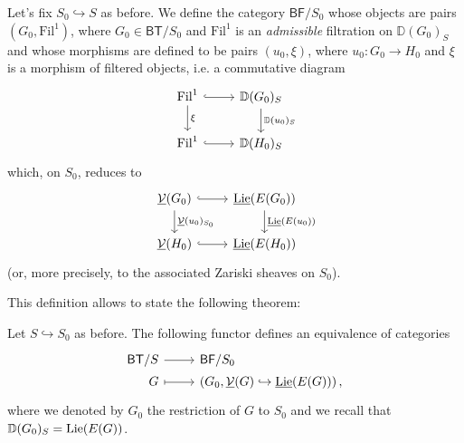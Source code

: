 \begin{defn}[]
	Let's fix $S_0 \hookrightarrow S$ as before.
	We define the category $\mathsf{BF}/S_0$ whose objects
	are pairs $(G_0, \mathrm{Fil}^1)$, where $G_0 \in \mathsf{BT}/S_0$
	and $\mathrm{Fil}^1$ is an \emph{admissible} filtration on
	$\mathbb{D}(G_0)_S$ and whose morphisms are defined to be
	pairs $(u_0, \xi)$, where $u_0\colon G_0 \to H_0$
	and $\xi$ is a morphism of filtered objects, i.e$.$ a commutative diagram
	\begin{equation*}
	\begin{tikzcd}
		\mathrm{Fil}^1 \arrow[d, "\xi", rightarrow] 
		\arrow[r, "", hookrightarrow] &
		\mathbb{D}(G_0)_S 
		\arrow[d, "\mathbb{D}(u_0)_S", rightarrow] \\
		\mathrm{Fil}^1 \arrow[r, "", hookrightarrow] &
		\mathbb{D}(H_0)_S
	\end{tikzcd}
	\end{equation*}
	which, on $S_0$, reduces to
	\begin{equation*}
	\begin{tikzcd}
		\underline{\mathcal{V}}(G_0) \arrow[r, "", hookrightarrow] 
		\arrow[d, "\underline{\mathcal{V}}(u_0)_{S_0}", rightarrow] &
		\underline{\lie}(E(G_0))
		\arrow[d, "\underline{\lie}(E(u_0))", rightarrow] \\
		\underline{\mathcal{V}}(H_0) \arrow[r, "", hookrightarrow] &
		\underline{\lie}(E(H_0))
	\end{tikzcd}
	\end{equation*}
	(or, more precisely, to the associated Zariski sheaves on $S_0$).
\end{defn}


\noindent
This definition allows to state the following theorem:
\begin{thm}\label{thm:EquivCatBTS}
	Let $S \hookrightarrow S_0$ as before.
	The following functor defines an equivalence of categories
	\begin{equation*}
	\begin{tikzcd}[row sep = 0ex
		,/tikz/column 1/.append style={anchor=base east}
		,/tikz/column 2/.append style={anchor=base west}]
		\mathsf{BT}/S \arrow[r, "", rightarrow] &
		\mathsf{BF}/S_0 \\
		G \arrow[r, "", mapsto] & 
		\left(G_0, \underline{\mathcal{V}}(G) \hookrightarrow \underline{\lie}(E(G))\right)
	,\end{tikzcd}
	\end{equation*} 
	where we denoted by $G_0$ the restriction of $G$ to $S_0$
	and we recall that $\mathbb{D}(G_0)_S = \operatorname{Lie}(E(G))$.
\end{thm}


